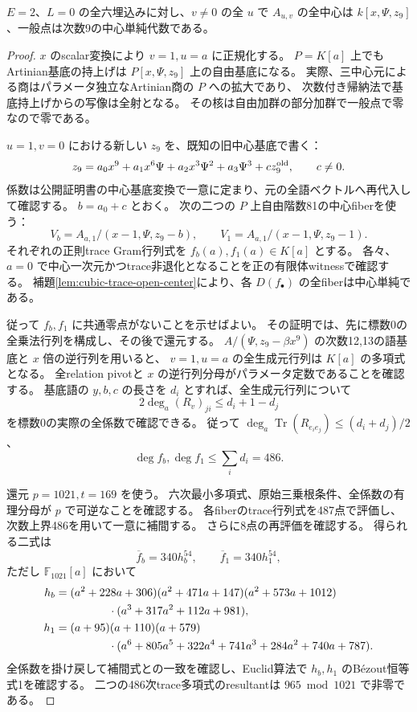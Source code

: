 \begin{theorem}[$E=2$ の全二変形で中心単純次数9]
\label{thm:cubic-third-root-unit-boundary-L-E2-CSA}
$E=2$、$L=0$ の全六埋込みに対し、$v\ne0$ の全 $u$ で
$A_{u,v}$ の全中心は $k[x,\Psi,z_9]$、一般点は次数9の中心単純代数である。
\end{theorem}
\begin{proof}
$x$ のscalar変換により $v=1,u=a$ に正規化する。
$P=K[a]$ 上でもArtinian基底の持上げは
$P[x,\Psi,z_9]$ 上の自由基底になる。
実際、三中心元による商はパラメータ独立なArtinian商の $P$ への拡大であり、
次数付き帰納法で基底持上げからの写像は全射となる。
その核は自由加群の部分加群で一般点で零なので零である。

$u=1,v=0$ における新しい $z_9$ を、既知の旧中心基底で書く：
\[
 z_9=a_0x^9+a_1x^6\Psi+a_2x^3\Psi^2+a_3\Psi^3+c z_9^{\rm old},\qquad c\ne0.
\]
係数は公開証明書の中心基底変換で一意に定まり、元の全語ベクトルへ再代入して確認する。
$b=a_0+c$ とおく。
次の二つの $P$ 上自由階数81の中心fiberを使う：
\[
 V_b=A_{a,1}/(x-1,\Psi,z_9-b),\qquad
 V_1=A_{a,1}/(x-1,\Psi,z_9-1).
\]
それぞれの正則trace Gram行列式を $f_b(a),f_1(a)\in K[a]$ とする。
各々、$a=0$ で中心一次元かつtrace非退化となることを正の有限体witnessで確認する。
補題\ref{lem:cubic-trace-open-center}により、各 $D(f_\bullet)$ の全fiberは中心単純である。

従って $f_b,f_1$ に共通零点がないことを示せばよい。
その証明では、先に標数0の全乗法行列を構成し、その後で還元する。
$A/(\Psi,z_9-\beta x^9)$ の次数12,13の語基底と $x$ 倍の逆行列を用いると、
$v=1,u=a$ の全生成元行列は $K[a]$ の多項式となる。
全relation pivotと $x$ の逆行列分母がパラメータ定数であることを確認する。
基底語の $y,b,c$ の長さを $d_i$ とすれば、全生成元行列について
\[
 2\deg_a (R_v)_{ji}\le d_i+1-d_j
\]
を標数0の実際の全係数で確認できる。
従って $\deg_a\operatorname{Tr}(R_{e_i e_j})\le(d_i+d_j)/2$、
\[
 \deg f_b,\deg f_1\le\sum_i d_i=486.
\]

還元 $p=1021,t=169$ を使う。
六次最小多項式、原始三乗根条件、全係数の有理分母が $p$ で可逆なことを確認する。
各fiberのtrace行列式を487点で評価し、次数上界486を用いて一意に補間する。
さらに8点の再評価を確認する。
得られる二式は
\[
 \overline f_b=340h_b^{54},\qquad \overline f_1=340h_1^{54},
\]
ただし $\mathbb F_{1021}[a]$ において
\begin{align*}
 h_b={}&(a^2+228a+306)(a^2+471a+147)(a^2+573a+1012)\\
 &\hspace{12mm}\cdot(a^3+317a^2+112a+981),\\
 h_1={}&(a+95)(a+110)(a+579)\\
 &\hspace{12mm}\cdot(a^6+805a^5+322a^4+741a^3+284a^2+740a+787).
\end{align*}
全係数を掛け戻して補間式との一致を確認し、Euclid算法で
$h_b,h_1$ のB\'ezout恒等式1を確認する。
二つの486次trace多項式のresultantは $965\bmod1021$ で非零である。


\end{proof}
